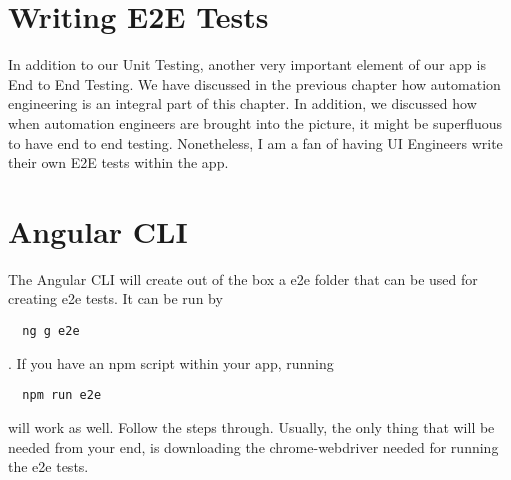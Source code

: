 \maketitle{}
\section{ Writing E2E Tests }

In addition to our Unit Testing, another very important element of our app is
End to End Testing. We have discussed in the previous chapter how automation
engineering is an integral part of this chapter. In addition, we discussed how
when automation engineers are brought into the picture, it might be superfluous
to have end to end testing. Nonetheless, I am a fan of having UI Engineers
write their own E2E tests within the app.

\section{ Angular CLI }
The Angular CLI will create out of the box a e2e folder that can be used for
creating e2e tests. It can be run by
\begin{verbatim}
  ng g e2e
\end{verbatim}
. If you have an npm script within your app, running
\begin{verbatim}
  npm run e2e
\end{verbatim}
will work as well. Follow the steps through. Usually, the only thing that will
be needed from your end, is downloading the chrome-webdriver needed for running
the e2e tests.
